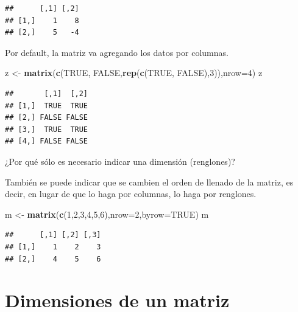 \documentclass[
]{book}
\newenvironment{Shaded}{\begin{snugshade}}{\end{snugshade}}
\newcommand{\AttributeTok}[1]{\textcolor[rgb]{0.13,0.29,0.53}{#1}}
\newcommand{\ConstantTok}[1]{\textcolor[rgb]{0.56,0.35,0.01}{#1}}
\newcommand{\DecValTok}[1]{\textcolor[rgb]{0.00,0.00,0.81}{#1}}
\newcommand{\FunctionTok}[1]{\textcolor[rgb]{0.13,0.29,0.53}{\textbf{#1}}}
\newcommand{\NormalTok}[1]{#1}
\newcommand{\OtherTok}[1]{\textcolor[rgb]{0.56,0.35,0.01}{#1}}
\begin{document}
\begin{verbatim}
##      [,1] [,2]
## [1,]    1    8
## [2,]    5   -4
\end{verbatim}

Por default, la matriz va agregando los datos por columnas.

\begin{Shaded}
\begin{Highlighting}[]
\NormalTok{z }\OtherTok{\textless{}{-}} \FunctionTok{matrix}\NormalTok{(}\FunctionTok{c}\NormalTok{(}\ConstantTok{TRUE}\NormalTok{, }\ConstantTok{FALSE}\NormalTok{,}\FunctionTok{rep}\NormalTok{(}\FunctionTok{c}\NormalTok{(}\ConstantTok{TRUE}\NormalTok{, }\ConstantTok{FALSE}\NormalTok{),}\DecValTok{3}\NormalTok{)),}\AttributeTok{nrow=}\DecValTok{4}\NormalTok{)}
\NormalTok{z}
\end{Highlighting}
\end{Shaded}

\begin{verbatim}
##       [,1]  [,2]
## [1,]  TRUE  TRUE
## [2,] FALSE FALSE
## [3,]  TRUE  TRUE
## [4,] FALSE FALSE
\end{verbatim}

¿Por qué sólo es necesario indicar una dimensión (renglones)?

También se puede indicar que se cambien el orden de llenado de la matriz, es decir, en lugar de que lo haga por columnas, lo haga por renglones.

\begin{Shaded}
\begin{Highlighting}[]
\NormalTok{m }\OtherTok{\textless{}{-}} \FunctionTok{matrix}\NormalTok{(}\FunctionTok{c}\NormalTok{(}\DecValTok{1}\NormalTok{,}\DecValTok{2}\NormalTok{,}\DecValTok{3}\NormalTok{,}\DecValTok{4}\NormalTok{,}\DecValTok{5}\NormalTok{,}\DecValTok{6}\NormalTok{),}\AttributeTok{nrow=}\DecValTok{2}\NormalTok{,}\AttributeTok{byrow=}\ConstantTok{TRUE}\NormalTok{)}
\NormalTok{m}
\end{Highlighting}
\end{Shaded}

\begin{verbatim}
##      [,1] [,2] [,3]
## [1,]    1    2    3
## [2,]    4    5    6
\end{verbatim}

\section{Dimensiones de un matriz}\label{dimensiones-de-un-matriz}
\end{document}
